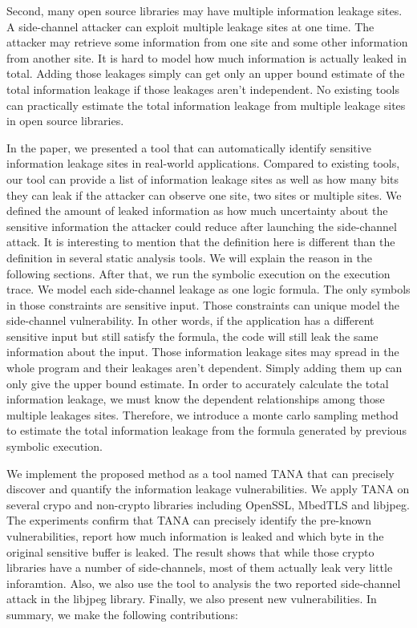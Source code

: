Second, many open source libraries may have multiple information leakage sites. 
A side-channel attacker can exploit multiple leakage sites at one time. The attacker
may retrieve some information from one site and some other information from another site.
It is hard to model how much information is actually leaked in total. Adding those leakages 
simply can get only an upper bound estimate of the total information leakage if those 
leakages aren’t independent. No existing tools can practically estimate the total information 
leakage from multiple leakage sites in open source libraries.

In the paper, we presented a tool that can automatically identify sensitive information 
leakage sites in real-world applications. Compared to existing tools, our tool can provide
a list of information leakage sites as well as how many bits they can leak if the attacker
can observe one site, two sites or multiple sites. We defined the amount of leaked information 
as how much uncertainty about the sensitive information the attacker could reduce after launching 
the side-channel attack. It is interesting to mention that the definition here is different than the 
definition in several static analysis tools. We will explain the reason in the following 
sections. After that, we run the symbolic execution on the execution trace. We model each 
side-channel leakage as one logic formula. The only symbols in those constraints are 
sensitive input. Those constraints can unique model the side-channel vulnerability. In other words, 
if the application has a different sensitive input but still satisfy the formula, the code will still 
leak the same information about the input.  Those information leakage sites may spread in the whole program 
and their leakages aren’t dependent. Simply adding them up can only give the upper bound 
estimate. In order to accurately calculate the total information leakage, we must know the 
dependent relationships among those multiple leakages sites. Therefore, we introduce a 
monte carlo sampling method to estimate the total information leakage from the formula
generated by previous symbolic execution. 

We implement the proposed method as a tool named TANA that can precisely discover and quantify the information
leakage vulnerabilities. We apply TANA on several crypo and non-crypto libraries including OpenSSL,
MbedTLS and libjpeg. The experiments confirm that TANA can precisely identify the pre-known vulnerabilities,
report how much information is leaked and which byte in the original sensitive buffer is leaked. 
The result shows that while those crypto libraries have a number of side-channels, most of them actually
leak very little inforamtion. Also, we also use the tool to analysis the two reported side-channel attack 
in the libjpeg library. Finally, we also present new vulnerabilities. In summary, we make the following
contributions:

